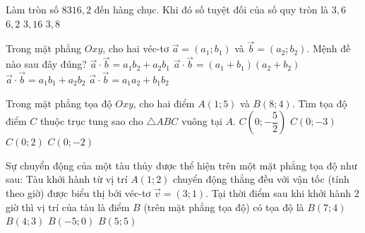 \begin{ex}%
   Làm tròn số $8316{,}2$ đến hàng chục. Khi đó số tuyệt đối của số quy tròn là
   \choice
   {$3{,}6$}
   {$6{,}2$}
   {$3{,}16$}
   {\True $3{,}8$}
\end{ex}

\begin{ex}%
   Trong mặt phẳng $Oxy$, cho hai véc-tơ $\overrightarrow{a}=(a_1;b_1)$ và $\overrightarrow{b} = \left(a_2;b_2\right)$. Mệnh đề nào sau đây đúng?
   \choice
   {$\overrightarrow{a}\cdot \overrightarrow{b} = a_1b_2 + a_2b_1$}
   {$\overrightarrow{a}\cdot \overrightarrow{b} = (a_1 + b_1)\left(a_2 + b_2\right)$}
   {$\overrightarrow{a}\cdot \overrightarrow{b} = a_1b_1 + a_2b_2$}
   {\True $\overrightarrow{a}\cdot \overrightarrow{b} = a_1a_2 + b_1b_2$}
\end{ex}

\begin{ex}%
   Trong mặt phẳng tọa độ $Oxy$, cho hai điểm $A(1;5)$ và $B(8;4)$. Tìm tọa độ điểm $C$ thuộc trục tung sao cho $\triangle ABC$ vuông tại $A$.
   \choice
   {$C\left(0;-\dfrac{5}{2}\right)$}
   {$C(0;-3)$}
   {$C(0;2)$}
   {\True $C(0;-2)$}
\end{ex}

\begin{ex}%
   Sự chuyển động của một tàu thủy được thể hiện trên một mặt phẳng tọa độ như sau: Tàu khởi hành từ vị trí $A(1;2)$ chuyển động thẳng đều với vận tốc (tính theo giờ) được biểu thị bởi véc-tơ $\overrightarrow{v} = (3;1)$. Tại thời điểm sau khi khởi hành $2$ giờ thì vị trí của tàu là điểm $B$ (trên mặt phẳng tọa độ) có tọa độ là
   \choice
   {\True $B(7;4)$}
   {$B(4;3)$}
   {$B(-5;0)$}
   {$B(5;5)$}
\end{ex}

